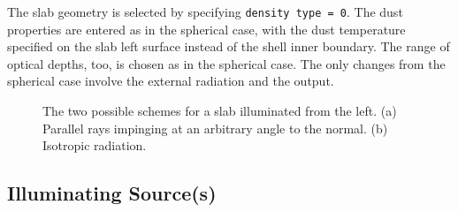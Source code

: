 \documentclass[12pt]{article} \usepackage{epsf}
\newif\ifpdf
\def\Figure#1#2{\centering \leavevmode \ifpdf \pdfimage width #2 #1.png
            \else \tthdump{\epsfclipon \epsfxsize=#2 \epsfbox{#1.ps}}\fi}
\def\tthdump#1{#1}      %
\begin{document}
The slab geometry is selected by specifying {\tt density type = 0}. The dust
properties are entered as in the spherical case, with the dust temperature
specified on the slab left surface instead of the shell inner boundary. The
range of optical depths, too, is chosen as in the spherical case. The only
changes from the spherical case involve the external radiation and the output.

\begin{figure}
\Figure{Fig2}{0.7\hsize}
\caption{The two possible schemes for a slab illuminated from the left.  (a)
Parallel rays impinging at an arbitrary angle to the normal. (b) Isotropic
radiation.}
\end{figure}

\subsection{Illuminating Source(s)}
\end{document}
